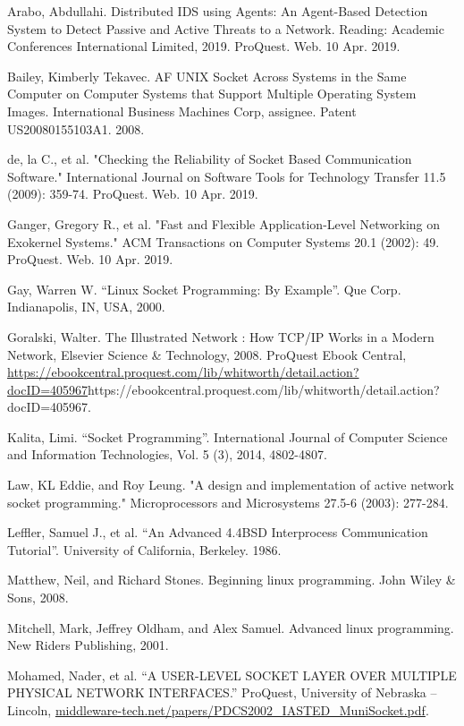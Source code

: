 \documentclass[conference, 12pt]{IEEEtran}
\begin{document}
\begin{thebibliography}{00}
Arabo, Abdullahi. Distributed IDS using Agents: An Agent-Based Detection System to Detect Passive and Active Threats to a Network. Reading: Academic Conferences International Limited, 2019. ProQuest. Web. 10 Apr. 2019.
 
Bailey, Kimberly Tekavec. AF UNIX Socket Across Systems in the Same Computer on Computer Systems that Support Multiple Operating System Images. International Business Machines Corp, assignee. Patent US20080155103A1. 2008.
     
de, la C., et al. "Checking the Reliability of Socket Based Communication Software." International Journal on Software Tools for Technology Transfer 11.5 (2009): 359-74. ProQuest. Web. 10 Apr. 2019.
     
Ganger, Gregory R., et al. "Fast and Flexible Application-Level Networking on Exokernel Systems." ACM Transactions on Computer Systems 20.1 (2002): 49. ProQuest. Web. 10 Apr. 2019.
     
Gay, Warren W. “Linux Socket Programming: By Example”. Que Corp. Indianapolis, IN, USA, 2000.
     
Goralski, Walter. The Illustrated Network : How TCP/IP Works in a Modern Network, Elsevier Science \& Technology, 2008. ProQuest Ebook Central, \url{https://ebookcentral.proquest.com/lib/whitworth/detail.action?docID=405967}{https://ebookcentral.proquest.com/lib/whitworth/detail.action?docID=405967}.
     
Kalita, Limi. “Socket Programming”. International Journal of Computer Science and Information Technologies, Vol. 5 (3), 2014, 4802-4807.
     
Law, KL Eddie, and Roy Leung. "A design and implementation of active network socket programming." Microprocessors and Microsystems 27.5-6 (2003): 277-284.
     
Leffler, Samuel J., et al. “An Advanced 4.4BSD Interprocess Communication Tutorial”. University of California, Berkeley. 1986.
     
Matthew, Neil, and Richard Stones. Beginning linux programming. John Wiley \& Sons, 2008.
     
Mitchell, Mark, Jeffrey Oldham, and Alex Samuel. Advanced linux programming. New Riders Publishing, 2001.
     
Mohamed, Nader, et al. “A USER-LEVEL SOCKET LAYER OVER MULTIPLE PHYSICAL NETWORK INTERFACES.” ProQuest, University of Nebraska – Lincoln, \url{middleware-tech.net/papers/PDCS2002_IASTED_MuniSocket.pdf}.
     

\end{thebibliography}
\end{document}
